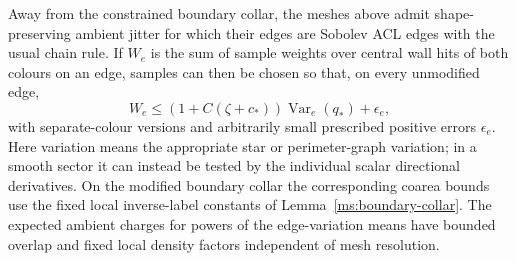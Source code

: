\begin{lemma}
\label{ms:edge-tests}
Away from the constrained boundary collar, the meshes above admit
shape-preserving ambient jitter for which their edges are Sobolev ACL
edges with the usual chain rule.  If $W_e$ is the sum of sample weights
over central wall hits of both colours on an edge, samples can then be
chosen so that, on every unmodified edge,
\begin{equation}
 W_e\le (1+C(\zeta+c_*))\operatorname{Var}_e(q_*)+\epsilon_e,
 \label{ms:weighted-count}
\end{equation}
with separate-colour versions and arbitrarily small prescribed
positive errors $\epsilon_e$.  Here variation means the appropriate
star or perimeter-graph variation; in a smooth sector it can instead
be tested by the individual scalar directional derivatives.  On the
modified boundary collar the corresponding coarea bounds use the fixed
local inverse-label constants of Lemma~\ref{ms:boundary-collar}.
The expected ambient charges for powers of the edge-variation means have
bounded overlap and fixed local density factors independent of mesh
resolution.
\end{lemma}

